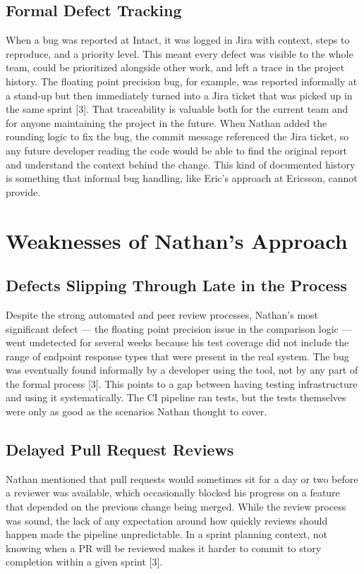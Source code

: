\documentclass[sigconf]{acmart}
\begin{document}
\subsection{Formal Defect Tracking}

When a bug was reported at Intact, it was logged in Jira with context, steps to reproduce, and a priority level. This meant every defect was visible to the whole team, could be prioritized alongside other work, and left a trace in the project history. The floating point precision bug, for example, was reported informally at a stand-up but then immediately turned into a Jira ticket that was picked up in the same sprint [3]. That traceability is valuable both for the current team and for anyone maintaining the project in the future. When Nathan added the rounding logic to fix the bug, the commit message referenced the Jira ticket, so any future developer reading the code would be able to find the original report and understand the context behind the change. This kind of documented history is something that informal bug handling, like Eric's approach at Ericsson, cannot provide.

\section{Weaknesses of Nathan's Approach}

\subsection{Defects Slipping Through Late in the Process}

Despite the strong automated and peer review processes, Nathan's most significant defect — the floating point precision issue in the comparison logic — went undetected for several weeks because his test coverage did not include the range of endpoint response types that were present in the real system. The bug was eventually found informally by a developer using the tool, not by any part of the formal process [3]. This points to a gap between having testing infrastructure and using it systematically. The CI pipeline ran tests, but the tests themselves were only as good as the scenarios Nathan thought to cover.

\subsection{Delayed Pull Request Reviews}

Nathan mentioned that pull requests would sometimes sit for a day or two before a reviewer was available, which occasionally blocked his progress on a feature that depended on the previous change being merged. While the review process was sound, the lack of any expectation around how quickly reviews should happen made the pipeline unpredictable. In a sprint planning context, not knowing when a PR will be reviewed makes it harder to commit to story completion within a given sprint [3].
\end{document}
